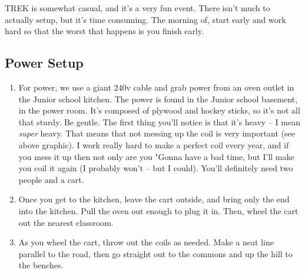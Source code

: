 \documentclass[letterpaper,10pt,oneside,headsepline]{scrreprt}
\begin{document}

TREK is somewhat casual, and it's a very fun event. There isn't much to actually setup, but it's time consuming. The morning of, start early and work hard so that the worst that happens is you finish early. 
\subsection{Power Setup}
\begin{enumerate}
\item For power, we use a giant 240v cable and grab power from an oven outlet in the Junior school kitchen. The power is found in the Junior school basement, in the power room. It's composed of plywood and hockey sticks, so it's not all that sturdy. Be gentle. The first thing you'll notice is that it's heavy -- I mean \textit{super} heavy. That means that not messing up the coil is very important (see above graphic). I work really hard to make a perfect coil every year, and if you mess it up then not only are you "Gonna have a bad time,  but I'll make you coil it again (I probably won't -- but I could). You'll definitely need two people and a cart. 
\item Once you get to the kitchen, leave the cart outside, and bring only the end into the kitchen. Pull the oven out enough to plug it in. Then, wheel the cart out the nearest classroom.
\item As you wheel the cart, throw out the coils as needed. Make a neat line parallel to the road, then go straight out to the commons and up the hill to the benches.
\end{enumerate}
\end{document}
